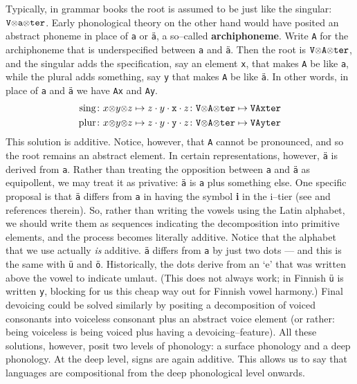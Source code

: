 Typically, in grammar books the root is assumed to be just like the 
singular: $\mbox{\tt V}\mbox{\small$\otimes$}\mbox{\tt a}\mbox{\small$\otimes$} \mbox{\tt ter}$. 
Early phonological theory on the other hand would have posited an 
abstract phoneme in place of {\tt a} or {\tt \"a}, a so--called 
\textbf{archiphoneme}. Write {\tt A} for the archiphoneme that is 
underspecified between {\tt a} 
and {\tt \"a}. Then the root is $\mbox{\tt V}\mbox{\small$\otimes$} \mbox{\tt A}
\mbox{\small$\otimes$} \mbox{\tt ter}$, and the singular adds the specification, 
say an element {\tt x}, that makes {\tt A} be like {\tt a}, while the 
plural adds something, say {\tt y} that makes {\tt A} be like {\tt \"a}.
In other words, in place of {\tt a} and {\tt \"a} we have
{\tt Ax} and {\tt Ay}.
\begin{align}
\mbox{\rm sing} & \colon x\mbox{\small$\otimes$} y \mbox{\small$\otimes$} z \mapsto 
z\cdot y \cdot \mbox{\tt x} \cdot z \colon 
\mbox{\tt V}\mbox{\small$\otimes$} \mbox{\tt A} \mbox{\small$\otimes$} 
\mbox{\tt ter} \mapsto \mbox{\tt VAxter} \\
\mbox{\rm plur} & \colon x\mbox{\small$\otimes$} y \mbox{\small$\otimes$} z \mapsto 
z\cdot y \cdot \mbox{\tt y} \cdot z \colon 
\mbox{\tt V}\mbox{\small$\otimes$} \mbox{\tt A} \mbox{\small$\otimes$} 
\mbox{\tt ter} \mapsto \mbox{\tt VAyter}
\end{align}
This solution is additive. Notice, however, that {\tt A} cannot be 
pronounced, and so the root remains an abstract element. In certain 
representations, however, {\tt \"a} is derived from {\tt a}. Rather 
than treating the opposition between {\tt a} and {\tt \"a} as equipollent, 
we may treat it as privative: {\tt \"a} is {\tt a} plus something else. 
One specific proposal is  that {\tt \"a} differs from {\tt a} in 
having the symbol \textbf{i} in the i--tier (see 
\cite{ewenvanderhulst:phonology} and references therein). So, 
rather than writing 
the vowels using the Latin alphabet, we should write them as sequences
indicating the decomposition into primitive elements, and the process 
becomes literally additive. Notice that the alphabet that we use 
actually {\it is\/} additive. {\tt \"a} differs from {\tt a} by 
just two dots --- and this is the same with {\tt \"u} and 
{\tt \"o}. Historically, the dots derive from an `e' that was 
written above the vowel to indicate umlaut. (This does not always 
work; in Finnish {\tt \"u} is written {\tt y}, blocking for us this 
cheap way out for Finnish vowel harmony.) 
Final devoicing could be solved similarly by positing a decomposition 
of voiced consonants into voiceless consonant plus an abstract voice 
element (or rather: being voiceless is being voiced plus having a 
devoicing--feature). All these solutions, however, posit two levels of 
phonology: a surface phonology and a deep phonology. At the deep level, 
signs are again additive. This allows us to say that languages are 
compositional from the deep phonological level onwards.

